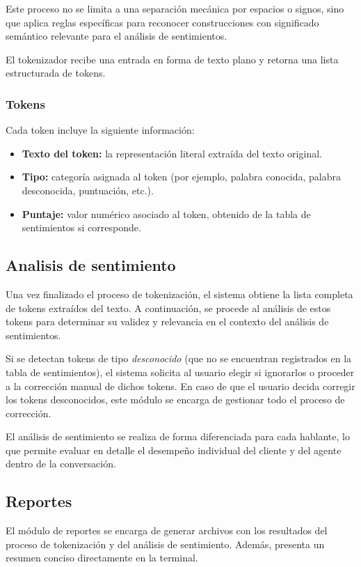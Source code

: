 Este proceso no se limita a una separación mecánica por espacios o signos, sino que aplica
reglas específicas para reconocer construcciones con significado semántico relevante para el
análisis de sentimientos.

El tokenizador recibe una entrada en forma de texto plano y retorna una lista estructurada de
tokens.

\subsubsection{Tokens}
Cada token incluye la siguiente información:

\begin{itemize}
	\item \textbf{Texto del token:} la representación literal extraída del texto original.
	\item \textbf{Tipo:} categoría asignada al token (por ejemplo, palabra conocida, palabra desconocida, puntuación, etc.).
	\item \textbf{Puntaje:} valor numérico asociado al token, obtenido de la tabla de sentimientos si corresponde.
\end{itemize}

\subsection{Analisis de sentimiento}

Una vez finalizado el proceso de tokenización, el sistema obtiene la lista completa de tokens
extraídos del texto. A continuación, se procede al análisis de estos tokens para determinar su
validez y relevancia en el contexto del análisis de sentimientos.

Si se detectan tokens de tipo \emph{desconocido} (que no se encuentran registrados en la tabla
de sentimientos), el sistema solicita al usuario elegir si ignorarlos o proceder a la
corrección manual de dichos tokens. En caso de que el usuario decida corregir los tokens
desconocidos, este módulo se encarga de gestionar todo el proceso de corrección.

El análisis de sentimiento se realiza de forma diferenciada para cada hablante, lo que permite
evaluar en detalle el desempeño individual del cliente y del agente dentro de la conversación.

\subsection{Reportes}
El módulo de reportes se encarga de generar archivos con los resultados del proceso de
tokenización y del análisis de sentimiento. Además, presenta un resumen conciso directamente en
la terminal.

